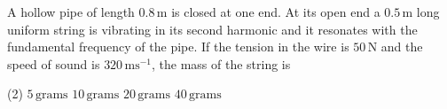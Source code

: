 \item A hollow pipe of length \(0.8 \, \mathrm{m}\) is closed at one end. At its open end a \(0.5 \, \mathrm{m}\) long uniform string is vibrating in its second harmonic and it resonates with the fundamental frequency of the pipe. If the tension in the wire is \(50 \, \mathrm{N}\) and the speed of sound is \(320 \, \mathrm{ms^{-1}}\), the mass of the string is
    \begin{tasks}(2)
        \task \(5 \, \mathrm{grams}\)
        \task \(10 \, \mathrm{grams}\)
        \task \(20 \, \mathrm{grams}\)
        \task \(40 \, \mathrm{grams}\)
    \end{tasks}
